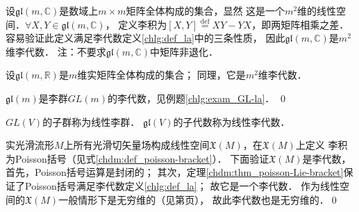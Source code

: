 \begin{example}\label{chlg:exm_GL-a}
    设$\mathfrak{gl}(m,\mathbb{C})$是数域上$m\times m$矩阵全体构成的集合，显然
    这是一个$m^2$维的线性空间．$\forall X,Y\in \mathfrak{gl}(m,\mathbb{C})$，
    定义李积为$[X,Y]\overset{\mathrm {def}}{=}XY-YX$，即两矩阵相乘之差．
    容易验证此定义满足李代数定义\ref{chlg:def_la}中的三条性质，
    因此$\mathfrak{gl}(m,\mathbb{C})$是$m^2$维李代数．
    注：不要求$\mathfrak{gl}(m,\mathbb{C})$中矩阵非退化．
        
    设$\mathfrak{gl}(m,\mathbb{R})$是$m$维实矩阵全体构成的集合；
    同理，它是$m^2$维李代数．
    
    $\mathfrak{gl}(m)$是李群$GL(m)$的李代数，见例题\ref{chlg:exam_GL-la}． \qed
\end{example}


 
\begin{definition}
    $GL(V)$的子群称为{\heiti 线性李群}．
    $\mathfrak{gl}(V)$的子代数称为{\heiti 线性李代数}．
\end{definition}

\begin{example}\label{chlg:exm_LAXM}
    实光滑流形$M$上所有光滑切矢量场构成线性空间$\mathfrak{X}(M)$，在$\mathfrak{X}(M)$上定义
    李积为Poisson括号（见式\eqref{chdm:def_poisson-bracket}）．
    下面验证$\mathfrak{X}(M)$是李代数，首先，Poisson括号运算是封闭的；
    其次，定理\ref{chdm:thm_poisson-Lie-bracket}保证了Poisson括号满足李代数定义\ref{chlg:def_la}；
    故它是一个李代数．
    作为线性空间的$\mathfrak{X}(M)$一般情形下是无穷维的（见第\pageref{chdm:eqn_rnumtimesv}页），
    故此李代数也是无穷维的．\qed
\end{example}






